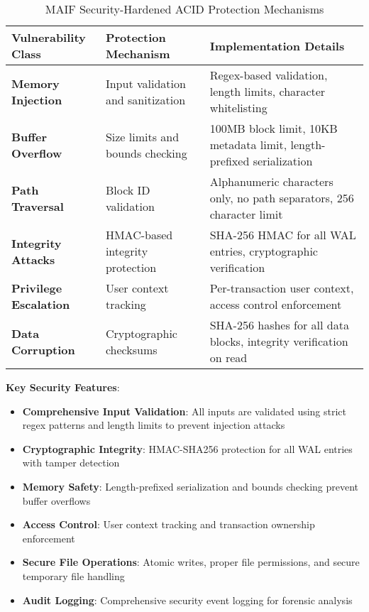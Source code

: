 \documentclass[conference]{IEEEtran}
\begin{document}
\begin{itemize}[leftmargin=*]
\begin{table*}[!t]
\renewcommand{\arraystretch}{1.3}
\caption{MAIF Security-Hardened ACID Protection Mechanisms}
\label{tab:acid-security-features}
\centering
\footnotesize
\begin{tabular}{p{3cm}p{5cm}p{6cm}}
\toprule
\textbf{Vulnerability Class} & \textbf{Protection Mechanism} & \textbf{Implementation Details} \\
\midrule
\textbf{Memory Injection} & Input validation and sanitization & Regex-based validation, length limits, character whitelisting \\
\midrule
\textbf{Buffer Overflow} & Size limits and bounds checking & 100MB block limit, 10KB metadata limit, length-prefixed serialization \\
\midrule
\textbf{Path Traversal} & Block ID validation & Alphanumeric characters only, no path separators, 256 character limit \\
\midrule
\textbf{Integrity Attacks} & HMAC-based integrity protection & SHA-256 HMAC for all WAL entries, cryptographic verification \\
\midrule
\textbf{Privilege Escalation} & User context tracking & Per-transaction user context, access control enforcement \\
\midrule
\textbf{Data Corruption} & Cryptographic checksums & SHA-256 hashes for all data blocks, integrity verification on read \\
\bottomrule
\end{tabular}
\end{table*}

\textbf{Key Security Features}:

\begin{itemize}[leftmargin=*]
\item \textbf{Comprehensive Input Validation}: All inputs are validated using strict regex patterns and length limits to prevent injection attacks
\item \textbf{Cryptographic Integrity}: HMAC-SHA256 protection for all WAL entries with tamper detection
\item \textbf{Memory Safety}: Length-prefixed serialization and bounds checking prevent buffer overflows
\item \textbf{Access Control}: User context tracking and transaction ownership enforcement
\item \textbf{Secure File Operations}: Atomic writes, proper file permissions, and secure temporary file handling
\item \textbf{Audit Logging}: Comprehensive security event logging for forensic analysis
\end{itemize}


\end{itemize}
\end{document}
